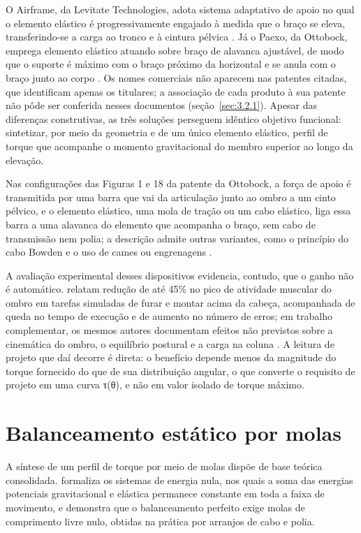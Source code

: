 O Airframe, da Levitate Technologies, adota sistema adaptativo de apoio no qual o elemento elástico é progressivamente engajado à medida que o braço se eleva, transferindo-se a carga ao tronco e à cintura pélvica \cite{doyle2017}. Já o Paexo, da Ottobock, emprega elemento elástico atuando sobre braço de alavanca ajustável, de modo que o suporte é máximo com o braço próximo da horizontal e se anula com o braço junto ao corpo \cite{mizera2023}. Os nomes comerciais não aparecem nas patentes citadas, que identificam apenas os titulares; a associação de cada produto à sua patente não pôde ser conferida nesses documentos (seção~\ref{sec:3.2.1}). Apesar das diferenças construtivas, as três soluções perseguem idêntico objetivo funcional: sintetizar, por meio da geometria e de um único elemento elástico, perfil de torque que acompanhe o momento gravitacional do membro superior ao longo da elevação.

Nas configurações das Figuras 1 e 18 da patente da Ottobock, a força de apoio é transmitida por uma barra que vai da articulação junto ao ombro a um cinto pélvico, e o elemento elástico, uma mola de tração ou um cabo elástico, liga essa barra a uma alavanca do elemento que acompanha o braço, sem cabo de transmissão nem polia; a descrição admite outras variantes, como o princípio do cabo Bowden e o uso de cames ou engrenagens \cite{mizera2023}.

A avaliação experimental desses dispositivos evidencia, contudo, que o ganho não é automático. \textcite{kim2018a} relatam redução de até 45\% no pico de atividade muscular do ombro em tarefas simuladas de furar e montar acima da cabeça, acompanhada de queda no tempo de execução e de aumento no número de erros; em trabalho complementar, os mesmos autores documentam efeitos não previstos sobre a cinemática do ombro, o equilíbrio postural e a carga na coluna \cite{kim2018b}. A leitura de projeto que daí decorre é direta: o benefício depende menos da magnitude do torque fornecido do que de sua distribuição angular, o que converte o requisito de projeto em uma curva τ(θ), e não em valor isolado de torque máximo.

\section{Balanceamento estático por molas}\label{sec:2.8}

A síntese de um perfil de torque por meio de molas dispõe de base teórica consolidada. \textcite{herder2001} formaliza os sistemas de energia nula, nos quais a soma das energias potenciais gravitacional e elástica permanece constante em toda a faixa de movimento, e demonstra que o balanceamento perfeito exige molas de comprimento livre nulo, obtidas na prática por arranjos de cabo e polia.

